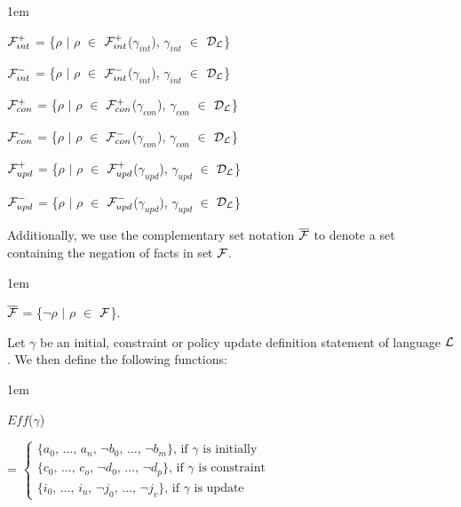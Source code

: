 \documentclass[global,twocolumn,final]{svjour}
\newenvironment{vquote}
  {\begin{list}{}{\leftmargin 1em}\item[]}
  {\end{list}}
\begin{document}
    \begin{vquote}
      ${\cal F}^{+}_{int}$ =
      \{$\rho$ $\mid$ $\rho$ $\in$ ${\cal F}^{+}_{int}$($\gamma_{int}$), $\gamma_{int}$ $\in$ ${\cal D}_{\cal L}$\}
                          
      ${\cal F}^{-}_{int}$ =
      \{$\rho$ $\mid$ $\rho$ $\in$ ${\cal F}^{-}_{int}$($\gamma_{int}$), $\gamma_{int}$ $\in$ ${\cal D}_{\cal L}$\}
                          
      ${\cal F}^{+}_{con}$ =
      \{$\rho$ $\mid$ $\rho$ $\in$ ${\cal F}^{+}_{con}$($\gamma_{con}$), $\gamma_{con}$ $\in$ ${\cal D}_{\cal L}$\}
                          
      ${\cal F}^{-}_{con}$ =
      \{$\rho$ $\mid$ $\rho$ $\in$ ${\cal F}^{-}_{con}$($\gamma_{con}$), $\gamma_{con}$ $\in$ ${\cal D}_{\cal L}$\}
                          
      ${\cal F}^{+}_{upd}$ =
      \{$\rho$ $\mid$ $\rho$ $\in$ ${\cal F}^{+}_{upd}$($\gamma_{upd}$), $\gamma_{upd}$ $\in$ ${\cal D}_{\cal L}$\}
                          
      ${\cal F}^{-}_{upd}$ =
      \{$\rho$ $\mid$ $\rho$ $\in$ ${\cal F}^{-}_{upd}$($\gamma_{upd}$), $\gamma_{upd}$ $\in$ ${\cal D}_{\cal L}$\}
    \end{vquote}

    Additionally, we use the complementary set notation
    $\overline{{\cal F}}$ to denote a set containing the negation of
    facts in set ${\cal F}$.

    \begin{vquote}
      $\overline{{\cal F}}$ =
      \{$\lnot\rho$ $\mid$ $\rho$ $\in$ ${\cal F}$\}.
    \end{vquote}

    Let $\gamma$ be an initial, constraint or policy update definition
    statement of language ${\cal L}$. We then define the following functions:

    \begin{vquote}
      $Eff$($\gamma$)

      \hspace{1em}
      =
      \begin{math}
        \begin{cases}
          \mbox{\{$a_{0}$, \ldots, $a_{n}$, $\lnot$$b_{0}$, \ldots, $\lnot$$b_{m}$\}, if $\gamma$ is initially} \\
          \mbox{\{$c_{0}$, \ldots, $c_{o}$, $\lnot$$d_{0}$, \ldots, $\lnot$$d_{p}$\}, if $\gamma$ is constraint} \\
          \mbox{\{$i_{0}$, \ldots, $i_{u}$, $\lnot$$j_{0}$, \ldots, $\lnot$$j_{v}$\}, if $\gamma$ is update}
        \end{cases}
      \end{math}
    \end{vquote}
\end{document}
